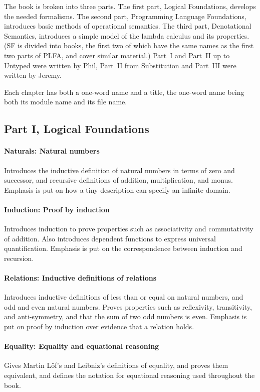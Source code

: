 \documentclass[preprint,authoryear]{elsarticle}
\begin{document}
The book is broken into three parts. The first part, Logical Foundations,
develops the needed formalisms.  The second part, Programming Language
Foundations, introduces basic methods of operational semantics.
The third part, Denotational Semantics, introduces a simple
model of the lambda calculus and its properties.
(SF is divided into books, the first two of which have the same names
as the first two parts of PLFA, and cover similar material.)
Part~I and Part~II up to Untyped were written by Phil,
Part~II from Substitution and Part~III were written by Jeremy.

Each chapter has both a one-word name and a title, the one-word name
being both its module name and its file name.

\subsection*{Part I, Logical Foundations}

\paragraph{Naturals: Natural numbers}
Introduces the inductive definition of natural numbers in terms of
zero and successor, and recursive definitions of addition,
multiplication, and monus. Emphasis is put on how a tiny description
can specify an infinite domain.

\paragraph{Induction: Proof by induction}
Introduces induction to prove properties
such as associativity and commutativity of addition.
Also introduces dependent functions to express universal quantification.
Emphasis is put on the correspondence between induction and recursion.

\paragraph{Relations: Inductive definitions of relations}
Introduces inductive definitions of less than or equal on natural numbers,
and odd and even natural numbers.
Proves properties such as reflexivity, transitivity, and
anti-symmetry, and that the sum of two odd numbers is even.
Emphasis is put on proof by induction over evidence that a relation holds.

\paragraph{Equality: Equality and equational reasoning}
Gives Martin L\"of's and Leibniz's definitions of equality, and proves
them equivalent, and defines the notation for equational reasoning used
throughout the book.
\end{document}
